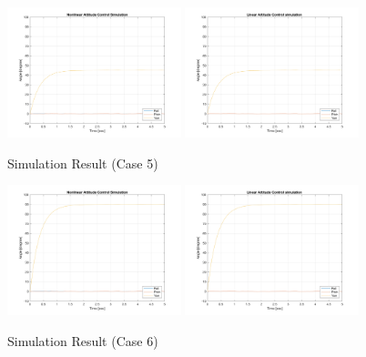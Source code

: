 \begin{figure}
    \centering
    \includegraphics[width=0.45\textwidth]{graphics/yaw_quarter_non.png}
    \includegraphics[width=0.45\textwidth]{graphics/yaw_quarter_pid.png}
    \caption{Simulation Result (Case 5)}
    \label{fig:sim_5}
\end{figure}

\begin{figure}
    \centering
    \includegraphics[width=0.45\textwidth]{graphics/yaw_half_non.png}
    \includegraphics[width=0.45\textwidth]{graphics/yaw_half_pid.png}
    \caption{Simulation Result (Case 6)}
    \label{fig:sim_6}
\end{figure}

